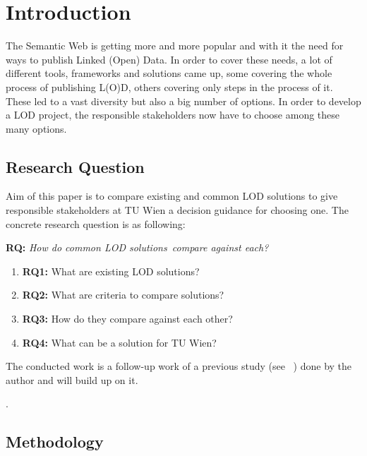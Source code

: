\chapter{Introduction}

The Semantic Web is getting more and more popular and with it the need for ways to publish Linked (Open) Data. In order to cover these needs, a lot of different tools, frameworks and solutions came up, some covering the whole process of publishing L(O)D, others covering only steps in the process of it. These led to a vast diversity but also a big number of options. In order to develop a LOD project, the responsible stakeholders now have to choose among these many options.

\section{Research Question}

Aim of this paper is to compare existing and common LOD solutions to give responsible stakeholders at TU Wien a decision guidance for choosing one. The concrete research question is as following:

\textbf{RQ:} \textit{How do common LOD solutions~\footnotemark compare against each?}
\begin{enumerate}
\item \textbf{RQ1:} What are existing LOD solutions?
\item \textbf{RQ2:} What are criteria to compare solutions?
\item \textbf{RQ3:} How do they compare against each other?
\item \textbf{RQ4:} What can be a solution for TU Wien?
\end{enumerate}

The conducted work is a follow-up work of a previous study (see ~\cite{baronyai_publishing_2016}) done by the author and will build up on it.

.

\section{Methodology}

